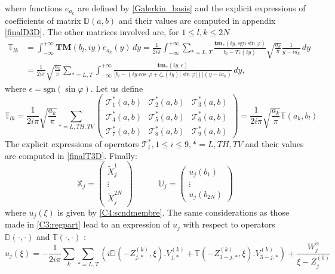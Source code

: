 where functions $e_{a_k}$ are defined by \eqref{Galerkin_basis} and the explicit expressions of coefficients of matrix $\mathbb{D}(a,b)$ and their values are computed in appendix \ref{finalD3D}. The other matrices involved are, for $1\leq l,k \leq 2N$
\begin{equation}
\begin{split}
\mathbb{T}_{lk}&=\int_{-\infty}^{+\infty} \textbf{TM}(b_l,iy)e_{a_k}(y) \, dy 
=\frac{1}{2i\pi} \int_{-\infty}^{+\infty} \sum_{*=L,T} \frac{\textbf{tm}_* (iy, \mbox{sgn} \sin \varphi)}{b_l-T_*(iy)} \sqrt{\frac{a_k}{\pi}}\frac{1}{y-ia_k}\,dy \\
&=\frac{1}{2i\pi}\sqrt{\frac{a_k}{\pi}}\sum_{*=L,T} \int_{-\infty}^{+\infty} \frac{\textbf{tm}_*(iy,\epsilon)}{\lbrack b_l-(iy \cos \varphi +  \zeta_*(iy)| \sin \varphi|)\rbrack(y-ia_k)} \, dy,
\end{split}
\end{equation}
where $\epsilon= \mbox{sgn}( \sin \varphi)$. Let us define
\begin{equation}
\mathbb{T}_{lk}=\frac{1}{2i\pi}\sqrt{\frac{a_k}{\pi}}
\sum_{*=L,TH,TV}
\begin{pmatrix}
\mathcal{T}_1^*(a,b) &  \mathcal{T}_2^*(a,b) &\mathcal{T}_3^*(a,b) \\
\mathcal{T}_4^*(a,b) &\mathcal{T}_5^*(a,b)&\mathcal{T}_6^*(a,b)\\
\mathcal{T}_7^*(a,b)&\mathcal{T}_8^*(a,b)&\mathcal{T}_9^*(a,b)
\end{pmatrix}
=\frac{1}{2i\pi}\sqrt{\frac{a_k}{\pi}}\mathbb{T}(a_k,b_l)
\label{Tab}
\end{equation}
The explicit expressions of operators $\mathcal{T}_i^*, 1\leq i\leq9, *=L,TH,TV$ and their values are computed in \ref{finalT3D}. Finally:
\begin{equation}
\mathbb{X}_j=
\begin{pmatrix}
\tilde{X}_j^1\\
\vdots \\
\tilde{X}_j^{2N}
\end{pmatrix}
\hspace{3em}
\mathbb{U}_j=
\begin{pmatrix}
u_j(b_1)\\
\vdots \\
u_j(b_{2N})
\end{pmatrix}
\end{equation}
where $u_j(\xi)$ is given by \eqref{C4:scndmembre}. The same considerations as those made in \ref{C3:regpart} lead to an expression of $u_j$ with respect to operators $\mathbb{D}(\cdot,\cdot)$ and $\mathbb{T}(\cdot,\cdot)$ :
\begin{equation}
u_j(\xi)=-\frac{1}{2i\pi}\sum_{k}\sum_{*=L,T}\left(i\mathbb{D}(-Z_{j,*}^{(k)},\xi).V_{j,*}^{(k)}+\mathbb{T}(-Z_{3-j,*}^{(k)},\xi).V_{3-j,*}^{(k)} \right) +\frac{W_j^{\alpha}}{\xi-Z_j^{(0)}}
\label{C4:uDT}
\end{equation}

